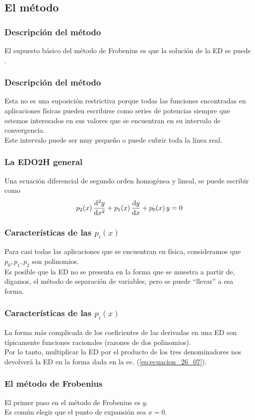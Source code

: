 \documentclass[12pt]{beamer}
\begin{document}
\subsection{El método}

\begin{frame}
\frametitle{Descripción del método}
El supuesto básico del método de Frobenius es que la solución de la ED se puede .
\end{frame}
\begin{frame}
\frametitle{Descripción del método}
Esta no es una suposición restrictiva porque todas las funciones encontradas en aplicaciones físicas pueden escribirse como series de potencias siempre que estemos interesados en sus valores que se encuentran en su intervalo de convergencia.
\\
\bigskip
\pause
Este intervalo puede ser muy pequeño o puede cubrir toda la línea real.
\end{frame}
\begin{frame}
\frametitle{La EDO2H general}
Una ecuación diferencial de segundo orden homogénea y lineal, se puede escribir como
\begin{align}
p_{2} (x) \, \dv[2]{y}{x} + p_{1} (x) \, \dv{y}{x} + p_{0}(x) \, y = 0
\label{eq:ecuacion_26_07}    
\end{align}
\end{frame}
\begin{frame}
\frametitle{Características de las $p_{i}(x)$}
Para casi todas las aplicaciones que se encuentran en física, consideramos que $p_{0}, p_{1}, p_{2}$ son polinomios.
\\
\bigskip
\pause
Es posible que la ED no se presenta en la forma que se muestra a partir de, digamos, el método de separación de variables, pero se puede \enquote{llevar} a esa forma.
\end{frame}
\begin{frame}
\frametitle{Características de las $p_{i}(x)$}
La forma más complicada de los coeficientes de las derivadas en una ED son típicamente funciones racionales (razones de dos polinomios).
\\
\bigskip
\pause
Por lo tanto, multiplicar la ED por el producto de los tres denominadores nos devolverá la ED en la forma dada en la ec. (\ref{eq:ecuacion_26_07}).
\end{frame}
\begin{frame}
\frametitle{El método de Frobenius}
El primer paso en el método de Frobenius es  $y$.
\\
\bigskip
\pause
Es común elegir que el punto de expansión sea $x = 0$.
\end{frame}
\end{document}

